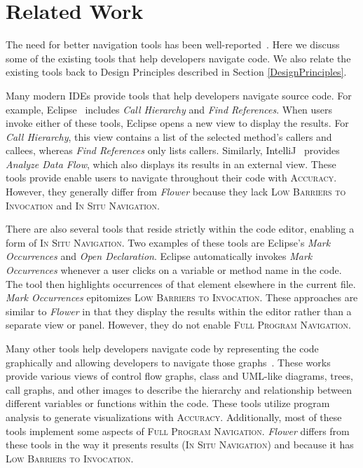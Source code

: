 \documentclass[conference]{IEEEtran}
\begin{document}
\section{Related Work}
The need for better navigation tools has been well-reported~\cite{ko2006seekInfo}.
Here we discuss some of the existing tools that help developers navigate code. 
We also relate the existing tools back to Design Principles described in Section \ref{DesignPrinciples}.

Many modern IDEs provide tools that help developers navigate source code. 
For example, Eclipse~\cite{Eclipse} includes \emph{Call Hierarchy} and \emph{Find References}. 
When users invoke either of these tools, Eclipse opens a new view to display the results.
For \emph{Call Hierarchy}, this view contains a list of the selected method's callers and callees, whereas \emph{Find References} only lists callers.
Similarly, IntelliJ~\cite{IntelliJ} provides \emph{Analyze Data Flow}, which also displays its results in an external view.
These tools provide enable users to navigate throughout their code with \textsc{Accuracy}. 
However, they generally differ from \textit{Flower} because they lack \textsc{Low Barriers to Invocation} and \textsc{In Situ Navigation}.

There are also several tools that reside strictly within the code editor, enabling a form of \textsc{In Situ Navigation}.
Two examples of these tools are Eclipse's \emph{Mark Occurrences} and \emph{Open Declaration}. 
Eclipse automatically invokes \emph{Mark Occurrences} whenever a user clicks on a variable or method name in the code.
The tool then highlights occurrences of that element elsewhere in the current file.
\emph{Mark Occurrences} epitomizes \textsc{Low Barriers to Invocation}.
These approaches are similar to \textit{Flower} in that they display the results within the editor rather than a separate view or panel.
However, they do not enable \textsc{Full Program Navigation}.


Many other tools help developers navigate code by representing the code graphically and allowing developers to navigate those graphs~\cite{CodeBubbles,CodeCanvas,CodeSurfer,Dora,Reacher,Relo,Whyline}. 
These works provide various views of control flow graphs, class and UML-like diagrams, trees, call graphs, and other images to describe the hierarchy and relationship between different variables or functions within the code. 
These tools utilize program analysis to generate visualizations with \textsc{Accuracy}.
Additionally, most of these tools implement some aspects of \textsc{Full Program Navigation}.
\textit{Flower} differs from these tools in the way it presents results (\textsc{In Situ Navigation}) and because it has \textsc{Low Barriers to Invocation}.
\end{document}

